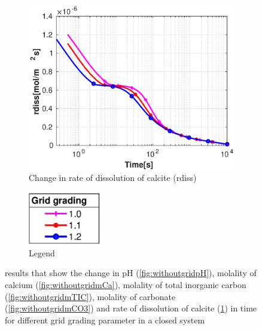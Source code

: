 \begin{figure}[!h]
\begin{subfigure}{.5\linewidth}
    \end{subfigure}%
    \hfill
    \begin{subfigure}{.5\linewidth}
            \centering
        \includegraphics[width=\textwidth]{PICTURES/without_grid_rdiss.eps}
        \caption{Change in rate of dissolution of calcite (rdiss)}
        \label{fig:withoutgridrdiss}
    \end{subfigure}%
  \hfill
  \begin{subfigure}{.5\linewidth}
            \centering
        \includegraphics[width=0.35\textwidth]{PICTURES/with_grid_legend.eps}
        \caption{Legend}
        \label{fig:withoutgridlegend}
    \end{subfigure}%
    \caption{\DuMuX results that show the change in pH (\cref{fig:withoutgridpH}), molality of calcium (\cref{fig:withoutgridmCa}), 
    molality of total inorganic carbon (\cref{fig:withoutgridmTIC}), molality of carbonate (\cref{fig:withoutgridmCO3}) 
    and rate of dissolution of calcite (\cref{fig:withoutgridrdiss}) in time for different grid grading parameter in a closed system} 
    \label{fig:comparisionWithoutDiffgrid}
\end{figure}

